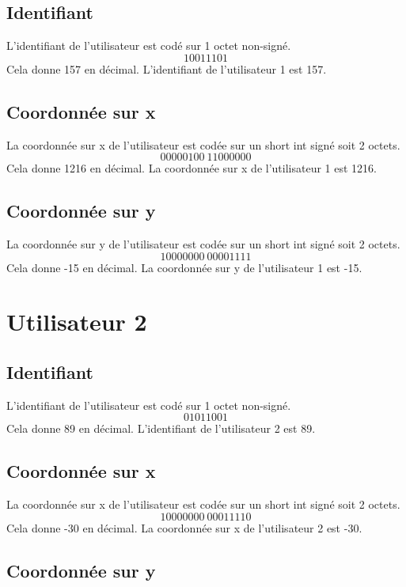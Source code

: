 \documentclass{article}
\begin{document}
\subsection{Identifiant}

L'identifiant de l'utilisateur est codé sur 1 octet non-signé.
\[10011101\]
Cela donne 157 en décimal. L'identifiant de l'utilisateur 1 est 157.

\subsection{Coordonnée sur x}

La coordonnée sur x de l'utilisateur est codée sur un short int signé soit 2 octets.
\[00000100 \ 11000000\]
Cela donne 1216 en décimal. La coordonnée sur x de l'utilisateur 1 est 1216.

\subsection{Coordonnée sur y}

La coordonnée sur y de l'utilisateur est codée sur un short int signé soit 2 octets.
\[10000000 \ 00001111\]
Cela donne -15 en décimal. La coordonnée sur y de l'utilisateur 1 est -15.

\section{Utilisateur 2}

\subsection{Identifiant}

L'identifiant de l'utilisateur est codé sur 1 octet non-signé.
\[01011001\]
Cela donne 89 en décimal. L'identifiant de l'utilisateur 2 est 89.

\subsection{Coordonnée sur x}

La coordonnée sur x de l'utilisateur est codée sur un short int signé soit 2 octets.
\[10000000 \ 00011110\]
Cela donne -30 en décimal. La coordonnée sur x de l'utilisateur 2 est -30.

\subsection{Coordonnée sur y}
\end{document}
